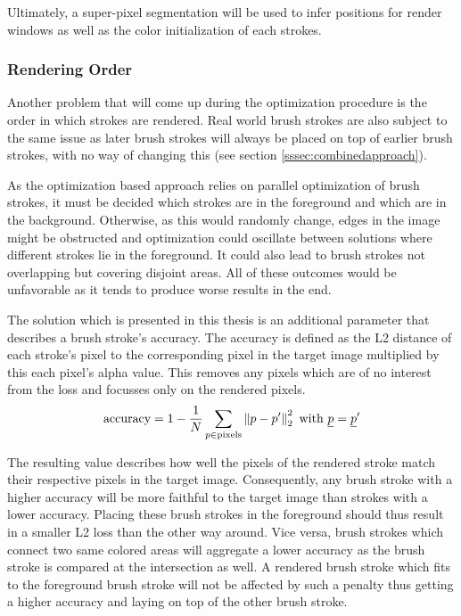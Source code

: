 Ultimately, a super-pixel segmentation will be used to infer positions for render
windows as well as the color initialization of each strokes.

\subsubsection{Rendering Order}
Another problem that will come up during the optimization procedure is the order
in which strokes are rendered.
Real world brush strokes are also subject to the same issue as later brush strokes
will always be placed on top of earlier brush strokes, with no way of changing this
(see section \ref{sssec:combinedapproach}).

As the optimization based approach relies on parallel optimization of brush strokes,
it must be decided which strokes are in the foreground and which are in the background.
Otherwise, as this would randomly change, edges in the image might be obstructed
and optimization could oscillate between solutions where different strokes lie in
the foreground.
It could also lead to brush strokes not overlapping but covering disjoint areas.
All of these outcomes would be unfavorable as it tends to produce worse results
in the end.

The solution which is presented in this thesis is an additional parameter that describes
a brush stroke's accuracy.
The accuracy is defined as the L2 distance of each stroke's pixel to the corresponding
pixel in the target image multiplied by this each pixel's alpha value.
This removes any pixels which are of no interest from the loss and focusses only
on the rendered pixels.
\begin{align}
    \text{accuracy} = 1 - \frac{1}{N} \sum_{p \in \text{pixels}} \left\lVert p - p'\right\rVert_2^2 \text{ with } \underline p = \underline p' 
\end{align}

The resulting value describes how well the pixels of the rendered stroke match their
respective pixels in the target image.
Consequently, any brush stroke with a higher accuracy will be more faithful to the
target image than strokes with a lower accuracy.
Placing these brush strokes in the foreground should thus result in a smaller L2 loss
than the other way around.
Vice versa, brush strokes which connect two same colored areas will aggregate a lower
accuracy as the brush stroke is compared at the intersection as well.
A rendered brush stroke which fits to the foreground brush stroke will not be affected by
such a penalty thus getting a higher accuracy and laying on top of the other brush
stroke.

